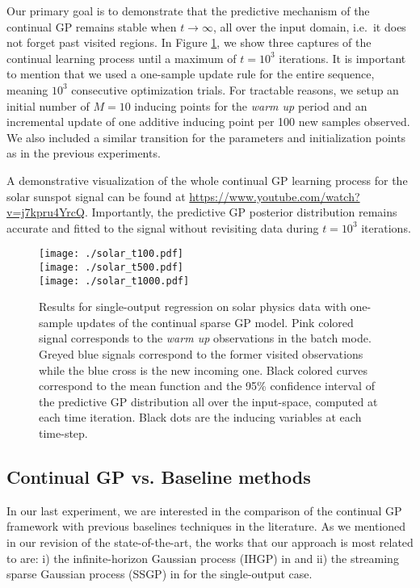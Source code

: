 \documentclass[]{article}
\begin{document}
Our primary goal is to demonstrate that the predictive mechanism of the continual GP remains stable when $t\rightarrow \infty$, all over the input domain, i.e.\ it does not forget past visited regions. In Figure \ref{fig:solar}, we show three captures of the continual learning process until a maximum of $t=10^3$ iterations. It is important to mention that we used a one-sample update rule for the entire sequence, meaning $10^3$ consecutive optimization trials. For tractable reasons, we setup an initial number of $M=10$ inducing points for the \textit{warm up} period and an incremental update of one additive inducing point per 100 new samples observed. We also included a similar transition for the parameters and initialization points as in the previous experiments.

A demonstrative visualization of the whole continual GP learning process for the solar sunspot signal can be found at \url{https://www.youtube.com/watch?v=j7kpru4YrcQ}. Importantly, the predictive GP posterior distribution remains accurate and fitted to the signal without revisiting data during $t=10^3$ iterations. 

\begin{figure}[] \centering
	\texttt{[image: ./solar\_t100.pdf]}\\
	\vspace{0.1cm}
	\texttt{[image: ./solar\_t500.pdf]}\\
	\vspace{0.1cm}
	\texttt{[image: ./solar\_t1000.pdf]}
	\caption{Results for single-output regression on solar physics data with one-sample updates of the continual sparse GP model. Pink colored signal corresponds to the \textit{warm up} observations in the batch mode. Greyed blue signals correspond to the former visited observations while the blue cross is the new incoming one. Black colored curves correspond to the mean function and the 95\% confidence interval of the predictive GP distribution all over the input-space, computed at each time iteration. Black dots are the inducing variables at each time-step.}
	\label{fig:solar}
\end{figure}



\subsection{Continual GP vs. Baseline methods}

In our last experiment, we are interested in the comparison of the continual GP framework with previous baselines techniques in the literature. As we mentioned in our revision of the state-of-the-art, the works that our approach is most related to are: i) the infinite-horizon Gaussian process (IHGP) in \citet{solin2018infinite} and ii) the streaming sparse Gaussian process (SSGP) in \citet{bui2017streaming} for the single-output case. 
\end{document}
